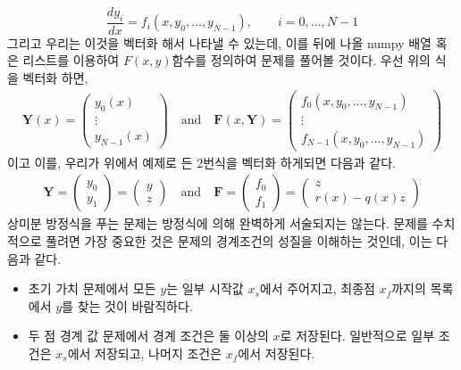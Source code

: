 \documentclass[11pt]{article}
\begin{document}
\begin{equation}
\frac{dy_i}{dx} = f_i(x, y_0, \dots, y_{N - 1})
,\qquad
i = 0, \dots, N - 1
\end{equation}
\noindent
그리고 우리는 이것을 벡터화 해서 나타낼 수 있는데, 이를 뒤에 나올 numpy 배열 혹은 리스트를 이용하여 $F(x,y)$함수를 정의하여 문제를 풀어볼 것이다. 우선 위의 식을 벡터화 하면,
\begin{equation}
\begin{split}
\mathbf{Y}(x) =
\left(
\begin{matrix}
y_0(x) \\ \vdots \\ y_{N - 1}(x)
\end{matrix}
\right)
\quad\mathrm{and}\quad
\mathbf{F}(x, \mathbf{Y}) =
\left(
\begin{matrix}
f_0(x, y_0, \dots, y_{N - 1}) \\ \vdots \\ f_{N - 1}(x, y_0, \dots, y_{N - 1})
\end{matrix}
\right)
\end{split}
\end{equation}
\noindent 
이고 이를, 우리가 위에서 예제로 든 2번식을 벡터화 하게되면 다음과 같다.
\begin{equation}
\begin{split}
\mathbf{Y} =
\left(
\begin{matrix}
y_0 \\ y_1
\end{matrix}
\right)
=
\left(
\begin{matrix}
y \\ z
\end{matrix}
\right)
\quad\mathrm{and}\quad
\mathbf{F} =
\left(
\begin{matrix}
f_0 \\ f_1
\end{matrix}
\right)
=
\left(
\begin{matrix}
z \\ r(x) - q(x) z
\end{matrix}
\right)
\end{split}
\end{equation}
\noindent 
상미분 방정식을 푸는 문제는 방정식에 의해 완벽하게 서술되지는 않는다. 문제를 수치적으로 풀려면 가장 중요한 것은 문제의 경계조건의 성질을 이해하는 것인데, 이는 다음과 같다.
\begin{itemize}
\item 초기 가치 문제에서 모든 $y$는 일부 시작값 $x_s$에서 주어지고, 최종점 $x_f$까지의 목록에서 $y$를 찾는 것이 바람직하다.
\item 두 점 경계 값 문제에서 경계 조건은 둘 이상의 $x$로 저장된다. 일반적으로 일부 조건은 $x_s$에서 저장되고, 나머지 조건은 $x_f$에서 저장된다.
\end{itemize}
\end{document}
